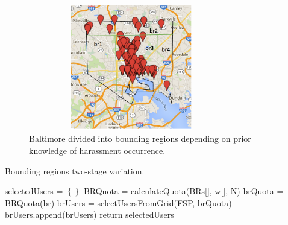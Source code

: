 \documentclass{acm_proc_article-sp}
\begin{document}
\begin{figure}[!h]
\centering
\includegraphics[width=9cm ,height=5.5cm]{figuresPng/BaltimoreBr.png}
\caption{Baltimore divided into bounding regions depending on prior knowledge of harassment occurrence.}
\label{fig: BaltimoreRegions}
\end{figure}


\begin{algorithm}
\caption{Bounding regions two-stage variation.}
\label{TSBR}
\begin{algorithmic}[1]
   \State selectedUsers = $\left\{\right\}$
    \State BRQuota = calculateQuota(BRs[], w[], N)
     \State brQuota = BRQuota(br)
   \State brUsers = selectUsersFromGrid(FSP, brQuota)
   \State brUsers.append(brUsers)
 \EndFor
\State return {selectedUsers}
\EndFunction
\end{algorithmic}
\end{algorithm}
\end{document}
